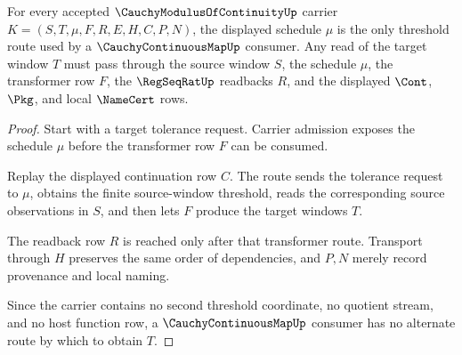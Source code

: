 \begin{theorem}
\label{thm:cauchy-modulus-of-continuity-cauchy-handoff}
For every accepted $\CauchyModulusOfContinuityUp$ carrier
$K=(S,T,\mu,F,R,E,H,C,P,N)$, the displayed schedule $\mu$ is the only
threshold route used by a $\CauchyContinuousMapUp$ consumer. Any read of the
target window $T$ must pass through the source window $S$, the schedule $\mu$,
the transformer row $F$, the $\RegSeqRatUp$ readbacks $R$, and the displayed
$\Cont$, $\Pkg$, and local $\NameCert$ rows.
\end{theorem}
\begin{proof}
Start with a target tolerance request. Carrier admission exposes the schedule
$\mu$ before the transformer row $F$ can be consumed.

Replay the displayed continuation row $C$. The route sends the tolerance
request to $\mu$, obtains the finite source-window threshold, reads the
corresponding source observations in $S$, and then lets $F$ produce the target
windows $T$.

The readback row $R$ is reached only after that transformer route. Transport
through $H$ preserves the same order of dependencies, and $P,N$ merely record
provenance and local naming.

Since the carrier contains no second threshold coordinate, no quotient stream,
and no host function row, a $\CauchyContinuousMapUp$ consumer has no alternate
route by which to obtain $T$.
\end{proof}

